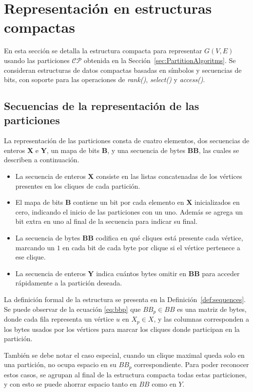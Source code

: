 \section{Representación en estructuras compactas}

En esta sección se detalla la estructura compacta para representar $G(V, E)$ usando las particiones $\mathcal{C}\mathcal{P}$ obtenida en la Sección~\ref{sec:PartitionAlgoritms}. Se consideran estructuras de datos compactas  basadas en símbolos y secuencias de bits, con soporte para las operaciones de \textit{rank()}, \textit{select()} y \textit{access()}.

\subsection{Secuencias de la representación de las particiones}
La representación de las particiones consta de cuatro elementos, dos secuencias de enteros \textbf{X} e \textbf{Y}, un mapa de bits \textbf{B}, y una secuencia de bytes \textbf{BB}, las cuales se describen a continuación.

\begin{itemize}
	\item La secuencia de enteros \textbf{X} consiste en las listas concatenadas de los vértices presentes en los cliques de cada partición.
	\item El mapa de bits \textbf{B} contiene un bit por cada elemento en \textbf{X} inicializados en cero, indicando el inicio de las particiones con un uno. Además se agrega un bit extra en uno al final de la secuencia para indicar su final.
	\item La secuencia de bytes \textbf{BB} codifica en qué cliques está presente cada vértice, marcando un  $1$ en cada bit de cada byte por clique si el vértice pertenece a ese clique.
	\item La secuencia de enteros \textbf{Y} indica cuántos bytes omitir en \textbf{BB} para acceder rápidamente a la partición deseada.
\end{itemize}

La definición formal de la estructura se presenta en la Definición~\ref{def:sequences}. Se puede observar de la ecuación \ref{eq:bbp} que $BB_{p} \in BB$ es una matriz de bytes, donde cada fila representa un vértice $u$ en $X_{p} \in X$, y las columnas corresponden a los bytes usados por los vértices para marcar los cliques donde participan en la partición. 

También se debe notar el caso especial, cuando un clique maximal queda solo en una partición, no ocupa espacio en su $BB_{p}$ correspondiente. Para poder reconocer estos casos, se agrupan al final de la estructura compacta todas estas particiones, y con esto se puede ahorrar espacio tanto en $BB$ como en $Y$.

